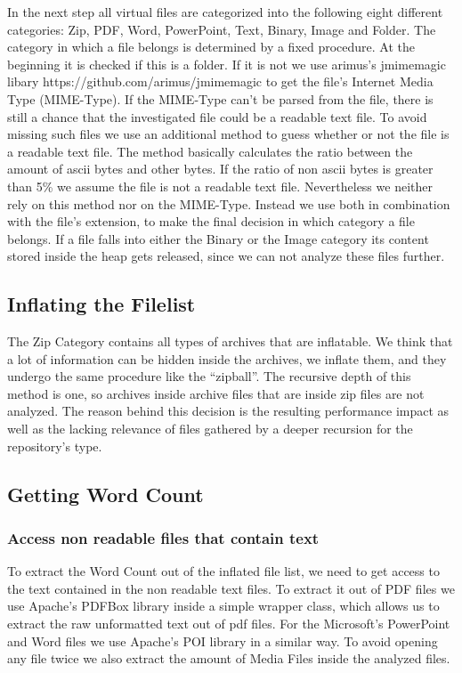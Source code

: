 \documentclass[paper=A4,pagesize=auto,12pt,headinclude=true,footinclude=true,BCOR=0mm,DIV=calc]{scrartcl}
\begin{document}
	In the next step all virtual files are categorized into the following eight different categories: Zip, PDF, Word, PowerPoint, Text, Binary, Image and Folder. The category in which a file belongs is determined by a fixed procedure. 
	At the beginning it is checked if this is a folder. If it is not we use arimus’s jmimemagic libary https://github.com/arimus/jmimemagic to get the file’s Internet Media Type (MIME-Type). If the MIME-Type can’t be parsed from the file, there is still a chance that the investigated file could be a readable text file. To avoid missing such files we use an additional method to guess whether or not the file is a readable text file. The method basically calculates the ratio between the amount of ascii bytes and other bytes. If the ratio of non ascii bytes is greater than 5\% we assume the file is not a readable text file. Nevertheless we neither rely on this method nor on the MIME-Type. Instead we use both in combination with the file’s extension, to make the final decision in which category a file belongs. If a file falls into either the Binary or the Image category its content stored inside the heap gets released, since we can not analyze these files further.
	
	\subsection{Inflating the Filelist}
	
	The Zip Category contains all types of archives that are inflatable. We think that a lot of information can be hidden inside the archives, we inflate them, and they undergo the same procedure like the “zipball”. The recursive depth of this method is one, so archives inside archive files that are inside zip files are not analyzed. The reason behind this decision is the resulting performance impact as well as the lacking relevance of files gathered by a deeper recursion for the repository’s type.
	
	\subsection{Getting Word Count}
	
	\subsubsection{ Access non readable files that contain text}
	To extract the Word Count out of the inflated file list, we need to get access to the text contained in the non readable text files. To extract it out of PDF files we use Apache’s PDFBox library inside a simple wrapper class, which allows us to extract the raw unformatted text out of pdf files. For the Microsoft’s PowerPoint and Word files we use Apache’s POI library in a similar way.
	To avoid opening any file twice we also extract the amount of Media Files inside the analyzed files. 
	
\end{document}
